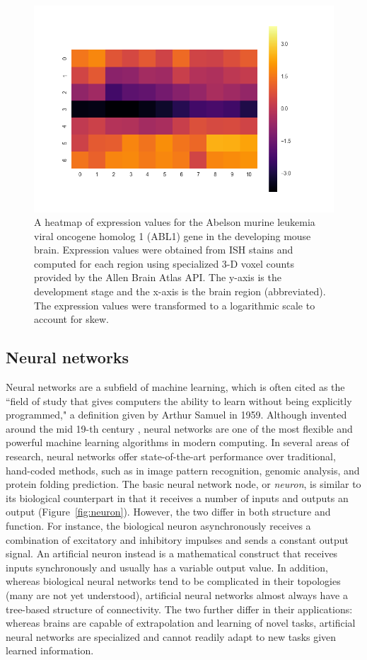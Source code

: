 \documentclass[12pt,oneside,onecolumn,a4paper]{article}
\begin{document}
\begin{figure}[h!]
\begin{center}
\includegraphics[width=0.8\columnwidth]{figures/Abl1/Abl1}
\caption{A heatmap of expression values for the Abelson murine leukemia viral oncogene homolog 1 (ABL1) gene in the developing mouse brain. Expression values were obtained from ISH stains and computed for each region using specialized 3-D voxel counts provided by the Allen Brain Atlas API. The y-axis is the development stage and the x-axis is the brain region (abbreviated). The expression values were transformed to a logarithmic scale to account for skew. \label{fig:matrix}%
}
\end{center}
\end{figure}

\subsection{Neural networks}
Neural networks are a subfield of machine learning, which is often cited as the ``field of study that gives computers the ability to learn without being
explicitly programmed," a definition given by Arthur Samuel in 1959. Although invented around the mid 19-th century \citep{Zilouchian2001FundamentalsON}, neural networks are one of the most flexible and powerful machine learning algorithms in modern computing. In several areas of research, neural networks offer state-of-the-art performance over traditional, hand-coded methods, such as in image pattern recognition, genomic analysis, and protein folding prediction. The basic neural network node, or \textit{neuron}, is similar to its biological counterpart in that it receives a number of inputs and outputs an output (Figure~\ref{fig:neuron}). However, the two differ in both structure and function. For instance, the biological neuron asynchronously receives a combination of excitatory and inhibitory impulses and sends a constant output signal. An artificial neuron instead is a mathematical construct that receives inputs synchronously and usually has a variable output value. In addition, whereas biological neural networks tend to be complicated in their topologies (many are not yet understood), artificial neural networks almost always have a tree-based structure of connectivity. The two further differ in their applications: whereas brains are capable of extrapolation and learning of novel tasks, artificial neural networks are specialized and cannot readily adapt to new tasks given learned information.
\end{document}
